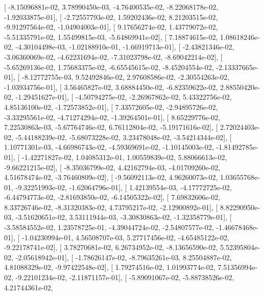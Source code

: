 \documentclass{article}
\begin{document}
       [ -8.15096881e-02,   3.78990450e-03,  -4.76400535e-02,
         -8.22068178e-02,  -1.92033875e-01],
       [ -2.72557793e-02,   1.59202436e-02,   8.21203515e-02,
         -9.91297564e-02,  -1.04904003e-01],
       [  9.17656274e-02,   1.43779072e-02,  -5.51335791e-02,
          1.55499815e-03,  -5.64869941e-02],
       [  7.18874615e-02,   1.08618246e-02,  -4.30104498e-03,
         -1.02188910e-01,  -1.66919713e-01],
       [ -2.43821346e-02,  -3.06360069e-02,  -4.62231694e-02,
         -7.31023798e-02,  -8.69042214e-02],
       [ -5.65269136e-02,   1.75683375e-02,  -6.65545615e-02,
         -8.45204554e-02,  -2.13337665e-01],
       [ -8.12772755e-03,   9.52492846e-02,   2.97608586e-02,
         -2.30554263e-02,  -1.03934756e-01],
       [  3.56465827e-02,   3.68884450e-02,  -6.82359622e-02,
          2.88550420e-02,  -1.29451627e-01],
       [ -4.50794275e-02,  -2.26967862e-02,   5.43322756e-02,
          4.85136100e-02,  -1.72573852e-01],
       [  7.33572605e-02,  -2.94895726e-02,  -3.33295561e-02,
         -4.71274294e-02,  -1.39264501e-01],
       [  8.65229776e-02,   7.22530863e-03,  -5.67764746e-02,
          6.76112804e-02,  -5.19171616e-02],
       [  2.72024403e-02,  -5.44188239e-02,  -5.68073228e-02,
          3.23478048e-02,  -3.54214344e-02],
       [  1.10771301e-03,  -4.66986743e-02,  -4.59369691e-02,
         -1.10145003e-02,  -1.81492785e-01],
       [ -1.42271827e-02,   1.04085312e-01,   1.00559839e-02,
          5.88066613e-02,  -9.66221215e-02],
       [ -8.35036799e-02,   4.42162794e-03,  -4.01709260e-02,
          4.51678474e-02,  -3.76460809e-02],
       [ -9.56092113e-02,   4.96260073e-02,   1.03655768e-01,
         -9.32251993e-02,  -1.62064796e-01],
       [  1.42139554e-03,  -4.17772725e-02,  -6.44794773e-02,
         -2.81693850e-02,  -6.14505322e-02],
       [  7.69832606e-02,   8.33726746e-02,  -8.31320383e-02,
          4.73795217e-02,  -2.12900892e-01],
       [  8.82290950e-03,  -3.51620651e-02,   3.53111944e-03,
         -3.30830863e-02,  -1.32358779e-01],
       [ -3.58584552e-02,   1.23578725e-01,  -4.39044724e-02,
         -2.54807577e-02,  -1.46678468e-01],
       [ -1.04230994e-01,   4.56508707e-03,   5.27717456e-02,
         -4.65485122e-02,  -9.22178741e-02],
       [  3.78270681e-02,   6.26734952e-02,  -8.13656590e-02,
          5.52395804e-02,  -2.05618942e-01],
       [ -1.78626147e-02,  -8.79635261e-03,   8.25504887e-02,
          4.81088329e-02,  -9.97422548e-02],
       [  1.79274516e-02,   1.01993774e-02,   7.51356994e-02,
         -9.22101234e-02,  -2.11871157e-01],
       [ -5.89091067e-02,  -5.88738526e-02,   4.21744361e-02,
\end{document}
